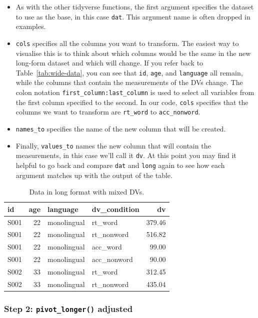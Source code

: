 \documentclass[
  english,
  doc,floatsintext]{apa6}
\begin{document}
\begin{itemize}
\item
  As with the other tidyverse functions, the first argument specifies the dataset to use as the base, in this case \texttt{dat}. This argument name is often dropped in examples.
\item
  \texttt{cols} specifies all the columns you want to transform. The easiest way to visualise this is to think about which columns would be the same in the new long-form dataset and which will change. If you refer back to Table~\ref{tab:wide-data}, you can see that \texttt{id}, \texttt{age}, and \texttt{language} all remain, while the columns that contain the measurements of the DVs change. The colon notation \texttt{first\_column:last\_column} is used to select all variables from the first column specified to the second. In our code, \texttt{cols} specifies that the columns we want to transform are \texttt{rt\_word} to \texttt{acc\_nonword}.
\item
  \texttt{names\_to} specifies the name of the new column that will be created.
\item
  Finally, \texttt{values\_to} names the new column that will contain the measurements, in this case we'll call it \texttt{dv}. At this point you may find it helpful to go back and compare \texttt{dat} and \texttt{long} again to see how each argument matches up with the output of the table.
\end{itemize}

\begin{table}

\caption{\label{tab:long1-example}Data in long format with mixed DVs.}
\centering
\begin{tabular}[t]{l|r|l|l|r}
\hline
id & age & language & dv\_condition & dv\\
\hline
S001 & 22 & monolingual & rt\_word & 379.46\\
\hline
S001 & 22 & monolingual & rt\_nonword & 516.82\\
\hline
S001 & 22 & monolingual & acc\_word & 99.00\\
\hline
S001 & 22 & monolingual & acc\_nonword & 90.00\\
\hline
S002 & 33 & monolingual & rt\_word & 312.45\\
\hline
S002 & 33 & monolingual & rt\_nonword & 435.04\\
\hline
\end{tabular}
\end{table}

\hypertarget{step-2-pivot_longer-adjusted}{%
\subsubsection{\texorpdfstring{Step 2: \texttt{pivot\_longer()} adjusted}{Step 2: pivot\_longer() adjusted}}\label{step-2-pivot_longer-adjusted}}
\end{document}

